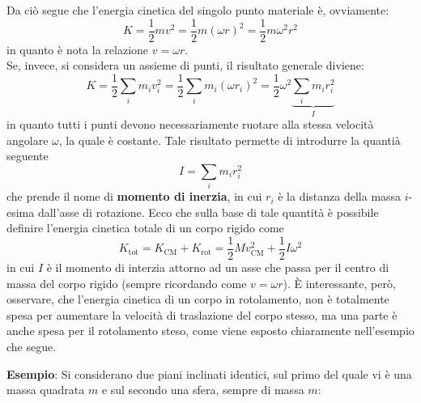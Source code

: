 \documentclass[a4paper]{extarticle}
\begin{document}
\noindent
Da ciò segue che l'energia cinetica del singolo punto materiale è, ovviamente:
\[K=\frac{1}{2}mv^2=\frac{1}{2}m(\omega r)^2=\frac{1}{2}m\omega^2r^2\]
in quanto è nota la relazione $v=\omega r$.\\
Se, invece, si considera un assieme di punti, il risultato generale diviene:
\[K=\frac{1}{2} \sum_i m_i v_i^2 = \frac{1}{2} \sum_i m_i (\omega r_i)^2 = \frac{1}{2} \omega^2 \underbrace{\sum_i m_i r_i^2}_{I}\]
in quanto tutti i punti devono necessariamente ruotare alla stessa velocità angolare $\omega$, la quale è costante. Tale risultato permette di introdurre la quantià seguente
\[\boxed{I=\sum_i m_i r_i^2}\]
che prende il nome di \textbf{momento di inerzia}, in cui $r_i$ è la distanza della massa $i$-esima dall'asse di rotazione. Ecco che sulla base di tale quantità è possibile definire l'energia cinetica totale di un corpo rigido come
\[\boxed{K_{\text{tot}} = K_{\text{CM}} + K_{\text{rot}} = \frac{1}{2}M v_{\text{CM}}^2 + \frac{1}{2}I \omega^2}\]
in cui $I$ è il momento di interzia attorno ad un asse che passa per il centro di massa del corpo rigido (sempre ricordando come $v=\omega r$). È interessante, però, osservare, che l'energia cinetica di un corpo in rotolamento, non è totalmente spesa per aumentare la velocità di traslazione del corpo stesso, ma una parte è anche spesa per il rotolamento steso, come viene esposto chiaramente nell'esempio che segue.

\vspace{1em}
\noindent
\textbf{Esempio}: Si considerano due piani inclinati identici, sul primo del quale vi è una massa quadrata $m$ e sul secondo una sfera, sempre di massa $m$:
\end{document}
